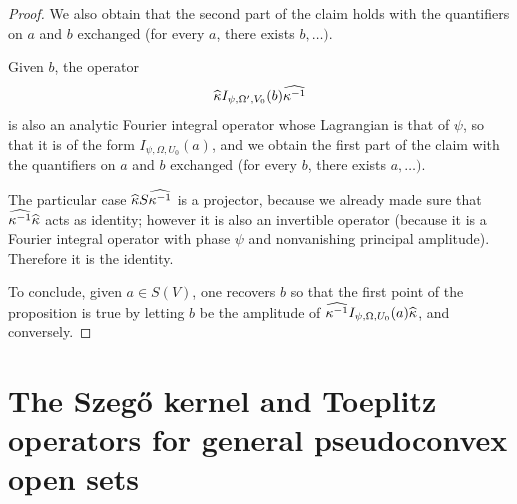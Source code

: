\documentclass[AHL,Unicode,longabstracts,published]{cedram}
\makeatletter
\newcommand{\clO}{\mathcal{O}}
\newcommand{\clF}{\mathcal{F}}
\newcommand{\clH}{\mathcal{H}}
\newcommand\1{\mathds{1}}
\let\save@mathaccent\mathaccent
\newcommand*\if@single[3]{%
  \setbox0\hbox{${\mathaccent"0362{#1}}^H$}%
  \setbox2\hbox{${\mathaccent"0362{\kern0pt#1}}^H$}%
  \ifdim\ht0=\ht2 #3\else #2\fi
  }
\newcommand*\rel@kern[1]{\kern#1\dimexpr\macc@kerna}
\newcommand*\widebar[1]{\@ifnextchar^{{\wide@bar{#1}{0}}}{\wide@bar{#1}{1}}}
\newcommand*\wide@bar[2]{\if@single{#1}{\wide@bar@{#1}{#2}{1}}{\wide@bar@{#1}{#2}{2}}}
\newcommand*\wide@bar@[3]{%
  \begingroup
  \def\mathaccent##1##2{%
    \let\mathaccent\save@mathaccent
    \if#32 \let\macc@nucleus\first@char \fi
    \setbox\z@\hbox{$\macc@style{\macc@nucleus}_{}$}%
    \setbox\tw@\hbox{$\macc@style{\macc@nucleus}{}_{}$}%
    \dimen@\wd\tw@
    \advance\dimen@-\wd\z@
    \divide\dimen@ 3
    \@tempdima\wd\tw@
    \advance\@tempdima-\scriptspace
    \divide\@tempdima 10
    \advance\dimen@-\@tempdima
    \ifdim\dimen@>\z@ \dimen@0pt\fi
    \rel@kern{0.6}\kern-\dimen@
    \if#31
      \overline{\rel@kern{-0.6}\kern\dimen@\macc@nucleus\rel@kern{0.4}\kern\dimen@}%
      \advance\dimen@0.4\dimexpr\macc@kerna
      \let\final@kern#2%
      \ifdim\dimen@<\z@ \let\final@kern1\fi
      \if\final@kern1 \kern-\dimen@\fi
    \else
      \overline{\rel@kern{-0.6}\kern\dimen@#1}%
    \fi
  }%
  \macc@depth\@ne
  \let\math@bgroup\@empty \let\math@egroup\macc@set@skewchar
  \mathsurround\z@ \frozen@everymath{\mathgroup\macc@group\relax}%
  \macc@set@skewchar\relax
  \let\mathaccentV\macc@nested@a
  \if#31
    \macc@nested@a\relax111{#1}%
  \else
    \def\gobble@till@marker##1\endmarker{}%
    \futurelet\first@char\gobble@till@marker#1\endmarker
    \ifcat\noexpand\first@char A\else
      \def\first@char{}%
    \fi
    \macc@nested@a\relax111{\first@char}%
  \fi
  \endgroup
}
\let\oldbar\bar
\renewcommand*{\bar}[1]{{\mathchoice{\widebar{#1}}{\widebar{#1}}{\widebar{#1}}{\oldbar{#1}}}}
\let\oldhat\hat
\renewcommand*{\hat}[1]{\mathchoice{\widehat{#1}}{\widehat{#1}}{\oldhat{#1}}{\oldhat{#1}}}
\let\oldmapsto\mapsto
\renewcommand*{\mapsto}{\mathchoice{\longmapsto}{\oldmapsto}{\oldmapsto}{\oldmapsto}}
\makeatother
\begin{document}
\begin{proof}
We also obtain that the second part of the claim holds with the quantifiers on $a$ and $b$ exchanged (for every $a$, there exists $b, \dots)$.

Given $b$, the operator
\[
\hat{\kappa}I_{\psi,\Omega',V_0}(b)\widehat{\kappa^{-1}}
\]
is also an analytic Fourier integral operator whose Lagrangian is that of $\psi$, so that it is of the form $I_{\psi,\Omega,U_0}(a)$, and we obtain the first part of the claim with the quantifiers on $a$ and $b$ exchanged (for every $b$, there exists $a, \dots)$.

The particular case $\hat{\kappa}S\widehat{\kappa^{-1}}$ is a projector, because we already made sure that $\widehat{\kappa^{-1}}\hat{\kappa}$ acts as identity; however it is also an invertible operator (because it is a Fourier integral operator with phase $\psi$ and nonvanishing principal amplitude). Therefore it is the identity.

To conclude, given $a\in S(V)$, one recovers $b$ so that the first point of the proposition is true by letting $b$ be the amplitude of $\widehat{\kappa^{-1}}I_{\psi,\Omega,U_0}(a)\hat{\kappa}$, and conversely.
\end{proof}


\section{The Szeg\H{o} kernel and Toeplitz operators for general pseudoconvex open sets}\label{sec:szegho-kern-toepl}
\end{document}
